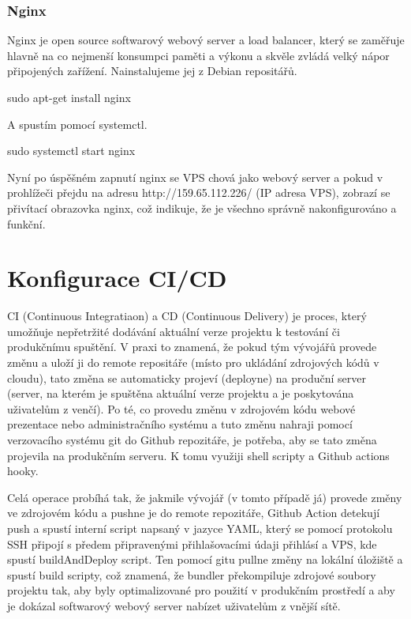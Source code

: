 \documentclass[12pt,a4paper]{report}
\begin{document}
  \subsubsection{Nginx}
  Nginx je open source softwarový webový server a load balancer, který se zaměřuje hlavně na co
  nejmenší konsumpci paměti a výkonu a skvěle zvládá velký nápor připojených zařížení.
  Nainstalujeme jej z Debian repositářů.
  \begin{bash}
    sudo apt-get install nginx
  \end{bash}
  A spustím pomocí systemctl.
  \begin{bash}
    sudo systemctl start nginx
  \end{bash}
  Nyní po úspěšném zapnutí nginx se VPS chová jako webový server a pokud v prohlížeči přejdu na adresu http://159.65.112.226/ (IP adresa VPS), zobrazí se přivítací obrazovka nginx, což indikuje, že je všechno správně nakonfigurováno a funkční. 
  
  \section{Konfigurace CI/CD}
  CI (Continuous Integratiaon) a CD (Continuous Delivery) je proces, který umožňuje nepřetržité 
  dodávání aktuální verze projektu k testování či produkčnímu spuštění. V praxi to znamená,
  že pokud tým vývojářů provede změnu a uloží ji do remote repositáře
  (místo pro ukládání zdrojových kódů v cloudu), tato změna se automaticky projeví (deployne)
  na produční server (server, na kterém je spuštěna aktuální verze projektu a je poskytována
  uživatelům z venčí).
  Po té, co provedu změnu v zdrojovém kódu webové prezentace nebo administračního systému a 
  tuto změnu nahraji pomocí verzovacího systému git do Github repozitáře, je potřeba, aby se 
  tato změna projevila na produkčním serveru. K tomu využiji shell scripty a Github actions hooky.

  Celá operace probíhá tak, že jakmile vývojář (v tomto případě já) provede změny ve zdrojovém kódu
  a pushne je do remote repozitáře, Github Action detekují push a spustí interní script napsaný
  v jazyce YAML, který se pomocí protokolu SSH připojí s předem připravenými přihlašovacími
  údaji přihlásí a VPS, kde spustí buildAndDeploy script. Ten pomocí gitu pullne změny na lokální úložiště 
  a spustí build scripty, což znamená, že bundler překompiluje zdrojové soubory projektu tak, aby byly 
  optimalizované pro použití v produkčním prostředí a aby je dokázal softwarový webový server nabízet uživatelům z vnější sítě.
  
\end{document}
